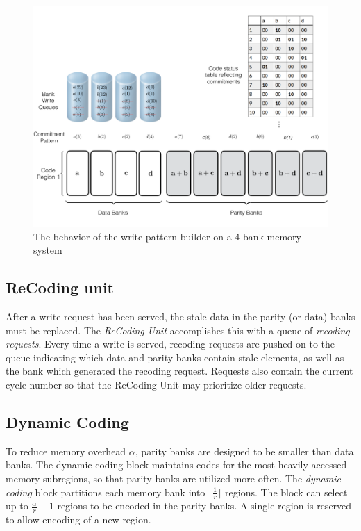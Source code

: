 \begin{figure}[t!]
\centering
         \includegraphics[width=\linewidth]{fig/Write-Algo-Example.png}
	\caption{The behavior of the write pattern builder on a 4-bank memory system}
	\label{fig:writeAlgoAccessPattern}
\end{figure}
\subsection{ReCoding unit}
\label{sec:recoding}
After a write request has been served, the stale data in the parity (or data) banks must be replaced. The \textit{ReCoding Unit} accomplishes this with a queue of {\em recoding requests}. Every time a write is served, recoding requests are pushed on to the queue indicating which data and parity banks contain stale elements, as well as the bank which generated the recoding request. Requests also contain the current cycle number so that the ReCoding Unit may prioritize older requests.

\subsection{Dynamic Coding}
\label{sec:dynamicCoding}
To reduce memory overhead $\alpha$, parity banks are designed to be smaller than data banks. The dynamic coding block maintains codes for the most heavily accessed memory subregions, so that parity banks are utilized more often.
%
%
The {\em dynamic coding} block partitions each memory bank into $\lceil\frac{1}{r}\rceil$ regions. The block can select up to $\frac{\alpha}{r} - 1$ regions to be encoded in the parity banks. A single region is reserved to allow encoding of a new region.

